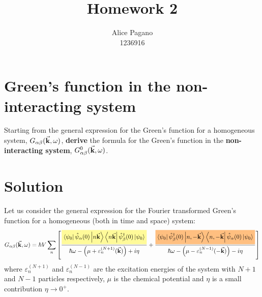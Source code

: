 \documentclass[11pt, a4paper, twoside, openright]{article}
\begin{document}
\title{\textbf{Homework 2}}

\author{Alice Pagano \\ 1236916}

\maketitle

\section{Green’s function in the non-interacting system}
Starting from the general expression for the Green’s function for a homogeneous system, \( G_{\alpha \beta } (\va{k}, \omega )\), \textbf{derive} the formula for the Green’s function in the \textbf{non-interacting system}, \( G_{\alpha \beta }^0 (\va{k}, \omega ) \).



\section*{Solution}
Let us consider the general expression for the Fourier transformed Green's function for a homogeneous (both in time and space) system:
\begin{equation}
  G_{\alpha \beta } (\va{k}, \omega )
  =  \hbar V \sum_{n}^{}
  \qty[
  \frac{
  \mathcolorbox{yellow!40}{\bra{\psi _0} \hat{\psi }_ \alpha
   (0) \ket{ n \va{k}} \bra{n \va{k}} \hat{\psi }_ \beta ^\dag (0) \ket{\psi _0} }
   }{ \hbar \omega - \qty( \mu + \varepsilon _n^{(N+1)}(\va{k})) + i \eta }
   +
  \frac{
  \mathcolorbox{orange!50}{\bra{\psi _0} \hat{\psi }_ \beta ^\dag (0) \ket{n, -\va{k}} \bra{n, -\va{k}}  \hat{\psi }_ \alpha
  (0)  \ket{\psi _0} }
   }{  \hbar \omega - \qty( \mu - \varepsilon _n^{(N-1)} (-\va{k})) - i \eta } ]
  \label{eq:start}
\end{equation}
where \( \varepsilon _n^{(N+1)}\) and \( \varepsilon _n^{(N-1)} \) are the excitation energies of the system with \( N+1 \) and \( N-1 \) particles respectively, \( \mu  \) is the chemical potential and \( \eta  \) is a small contribution \( \eta \rightarrow 0^+ \).
\end{document}
